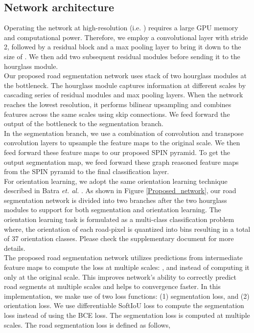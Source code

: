\documentclass[letterpaper, 10 pt, conference]{ieeeconf}
\begin{document}
\subsection{Network architecture}
 Operating the network at high-resolution (i.e. ) requires a large GPU memory and computational power. Therefore, we employ a  convolutional layer with stride 2, followed by a residual block and a max pooling layer to bring it down to the size of . We then add two subsequent residual modules before sending it to the hourglass module.\\
 Our proposed road segmentation network uses stack of two hourglass modules \cite{newell2016stacked} at the bottleneck. The hourglass module captures information at different scales by cascading series of residual modules and max pooling layers. When the network reaches the lowest resolution, it performs bilinear upsampling and combines features across the same scales using skip connections. We feed forward the output of the bottleneck to the segmentation branch.\\
 In the segmentation branch, we use a combination of convolution and transpose convolution layers to upsample the feature maps to the original scale. We then feed forward these feature maps to our proposed SPIN pyramid. To get the output segmentation map, we feed forward these graph reasoned feature maps from the SPIN pyramid to the final classification layer.\\  
 For orientation learning, we adopt the same orientation learning technique described in Batra \textit{et. al.} \cite{batra2019improved}. As shown in Figure \ref{Proposed_network}, our road segmentation network is divided into two branches after the two hourglass modules to support for both segmentation and orientation learning. The orientation learning task is formulated as a multi-class classification problem where, the orientation of each road-pixel is quantized into bins resulting in a total of 37 orientation classes. Please check the supplementary document for more details.\\
 The proposed road segmentation network utilizes predictions from intermediate feature maps to compute the loss at multiple scales: ,  and  instead of computing it only at the original scale. This improves network's ability to correctly predict road segments at multiple scales and helps to convergence faster. In this implementation, we make use of two loss functions: (1) segmentation loss, and (2) orientation loss. We use differentiable SoftIoU loss to compute the segmentation loss instead of using the BCE loss. The  segmentation loss is computed at multiple scales.  The road segmentation loss  is defined as follows,
\end{document}
